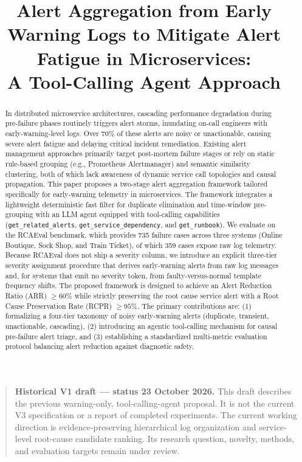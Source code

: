 \documentclass[conference]{IEEEtran}
\title{Alert Aggregation from Early Warning Logs to Mitigate Alert Fatigue in Microservices:\\A Tool-Calling Agent Approach}
\author{
\IEEEauthorblockN{Dang Quang Hien}
\IEEEauthorblockA{
Faculty of Information Technology\\
University of Science, VNU-HCM\\
Ho Chi Minh City, Vietnam\\
dqhien@fit.hcmus.edu.vn
}
}
\begin{document}
\maketitle

\begin{quote}
\textbf{Historical V1 draft --- status 23 October 2026.}
This draft describes the previous warning-only, tool-calling-agent proposal.
It is not the current V3 specification or a report of completed experiments.
The current working direction is evidence-preserving hierarchical log
organization and service-level root-cause candidate ranking. Its research
question, novelty, methods, and evaluation targets remain under review.
\end{quote}


\begin{abstract}
In distributed microservice architectures, cascading performance degradation during pre-failure phases routinely triggers alert storms, inundating on-call engineers with early-warning-level logs. Over 70\% of these alerts are noisy or unactionable, causing severe alert fatigue and delaying critical incident remediation. Existing alert management approaches primarily target post-mortem failure stages or rely on static rule-based grouping (e.g., Prometheus Alertmanager) and semantic similarity clustering, both of which lack awareness of dynamic service call topologies and causal propagation. This paper proposes a two-stage alert aggregation framework tailored specifically for early-warning telemetry in microservices. The framework integrates a lightweight deterministic fast filter for duplicate elimination and time-window pre-grouping with an LLM agent equipped with tool-calling capabilities (\texttt{get\_related\_alerts}, \texttt{get\_service\_dependency}, and \texttt{get\_runbook}). We evaluate on the RCAEval benchmark, which provides 735 failure cases across three systems (Online Boutique, Sock Shop, and Train Ticket), of which 359 cases expose raw log telemetry. Because RCAEval does not ship a severity column, we introduce an explicit three-tier severity assignment procedure that derives early-warning alerts from raw log messages and, for systems that emit no severity token, from faulty-versus-normal template frequency shifts. The proposed framework is designed to achieve an Alert Reduction Ratio (ARR) $\ge 60\%$ while strictly preserving the root cause service alert with a Root Cause Preservation Rate (RCPR) $\ge 95\%$. The primary contributions are: (1) formalizing a four-tier taxonomy of noisy early-warning alerts (duplicate, transient, unactionable, cascading), (2) introducing an agentic tool-calling mechanism for causal pre-failure alert triage, and (3) establishing a standardized multi-metric evaluation protocol balancing alert reduction against diagnostic safety.
\end{abstract}
\end{document}
